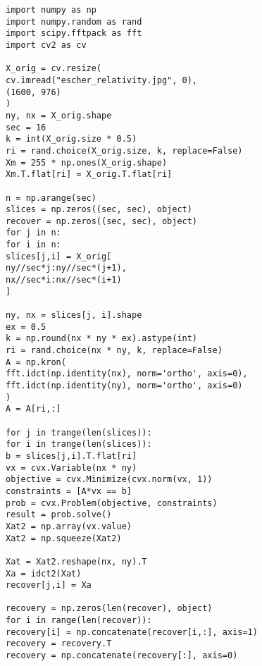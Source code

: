 \clearpage

\begin{lstlisting}
import numpy as np
import numpy.random as rand
import scipy.fftpack as fft
import cv2 as cv

X_orig = cv.resize(
cv.imread("escher_relativity.jpg", 0),
(1600, 976)
)
ny, nx = X_orig.shape
sec = 16
k = int(X_orig.size * 0.5)
ri = rand.choice(X_orig.size, k, replace=False)
Xm = 255 * np.ones(X_orig.shape)
Xm.T.flat[ri] = X_orig.T.flat[ri]

n = np.arange(sec)
slices = np.zeros((sec, sec), object)
recover = np.zeros((sec, sec), object)
for j in n:
for i in n:
slices[j,i] = X_orig[
ny//sec*j:ny//sec*(j+1),
nx//sec*i:nx//sec*(i+1)
]

ny, nx = slices[j, i].shape
ex = 0.5
k = np.round(nx * ny * ex).astype(int)
ri = rand.choice(nx * ny, k, replace=False)
A = np.kron(
fft.idct(np.identity(nx), norm='ortho', axis=0),
fft.idct(np.identity(ny), norm='ortho', axis=0)
)
A = A[ri,:]

for j in trange(len(slices)):
for i in trange(len(slices)):
b = slices[j,i].T.flat[ri]
vx = cvx.Variable(nx * ny)
objective = cvx.Minimize(cvx.norm(vx, 1))
constraints = [A*vx == b]
prob = cvx.Problem(objective, constraints)
result = prob.solve()
Xat2 = np.array(vx.value)
Xat2 = np.squeeze(Xat2)

Xat = Xat2.reshape(nx, ny).T
Xa = idct2(Xat)
recover[j,i] = Xa

recovery = np.zeros(len(recover), object)
for i in range(len(recover)):
recovery[i] = np.concatenate(recover[i,:], axis=1)
recovery = recovery.T
recovery = np.concatenate(recovery[:], axis=0)
\end{lstlisting}


